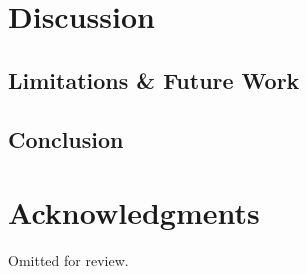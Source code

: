 \documentclass{sigchi}
\begin{document}
\section{Discussion}
\subsection{Limitations \& Future Work}
\subsection{Conclusion}
\section{Acknowledgments}

Omitted for review.

%
%
%
%
%
\balance{}




\end{document}
